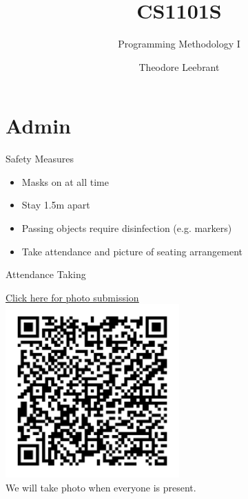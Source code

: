\documentclass[10pt]{beamer}
\title{CS1101S}
\subtitle{Programming Methodology I}
\date{}
\author{Theodore Leebrant}
\institute{Studio 2 - Tutorial Group 8D}
\begin{document}
\maketitle


\section[Admin Stuff]{Admin}


\begin{frame}{Safety Measures}
\begin{itemize}
  \item Masks on at all time
  \item Stay 1.5m apart
  \item Passing objects require disinfection (e.g. markers)
  \item Take attendance and picture of seating arrangement
\end{itemize}
\end{frame}

\begin{frame}[fragile]{Attendance Taking}
\begin{centering}
\href{https://inetapps.nus.edu.sg/ctr/Session/Details/158206}{\underline{Click here for photo submission}} \\
\includegraphics[width=0.5\textwidth]{qrattendancestudio2.png} \\
We will take photo when everyone is present. \\
\end{centering}
\end{frame}
\end{document}
